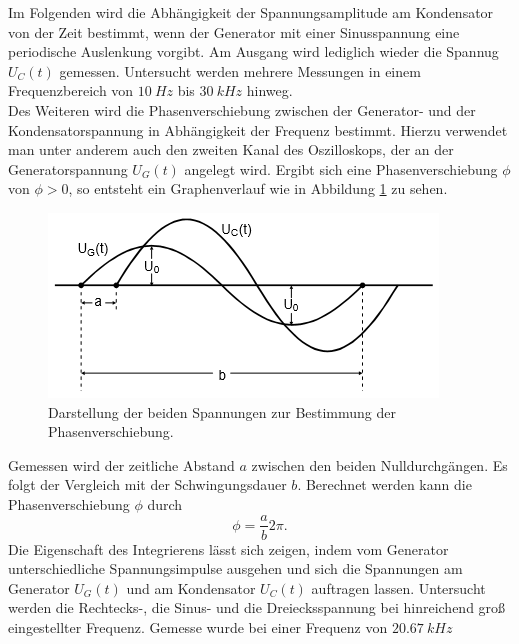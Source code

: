 Im Folgenden wird die Abhängigkeit der Spannungsamplitude am Kondensator von der Zeit bestimmt, wenn der Generator mit einer Sinusspannung
eine periodische Auslenkung vorgibt.\newline
Am Ausgang wird lediglich wieder die Spannug $U_C(t)$ gemessen.\newline
Untersucht werden mehrere Messungen in einem Frequenzbereich von $\SI{10}{Hz}$ bis $\SI{30}{kHz}$ hinweg.\\

Des Weiteren wird die Phasenverschiebung zwischen der Generator- und der Kondensatorspannung in Abhängigkeit der Frequenz bestimmt.\newline
Hierzu verwendet man unter anderem auch den zweiten Kanal des Oszilloskops, der an der Generatorspannung $U_G(t)$ angelegt wird.\newline
Ergibt sich eine Phasenverschiebung $\phi$ von $\phi > 0$, so entsteht ein Graphenverlauf wie in Abbildung \ref{fig:phase} zu sehen.\newline
\begin{figure}[H]
  \centering
  \includegraphics[scale=0.8]{bilder/bild4.png}
  \caption{Darstellung der beiden Spannungen zur Bestimmung der Phasenverschiebung\cite{anleitung}.}
  \label{fig:phase}
\end{figure}
Gemessen wird der zeitliche Abstand $a$ zwischen den beiden Nulldurchgängen. Es folgt der Vergleich mit der Schwingungsdauer $b$.\newline
Berechnet werden kann die Phasenverschiebung $\phi$ durch
\begin{equation}
\phi = \frac{a}{b} 2 \pi.
\label{eq:phi}
\end{equation}
Die Eigenschaft des Integrierens lässt sich zeigen, indem vom Generator unterschiedliche Spannungsimpulse ausgehen und sich die Spannungen am Generator $U_G(t)$ und am Kondensator $U_C(t)$
auftragen lassen. Untersucht werden die Rechtecks-, die Sinus- und die Dreiecksspannung bei hinreichend groß eingestellter Frequenz. Gemesse wurde bei einer Frequenz von $\SI{20,67}{kHz}$
